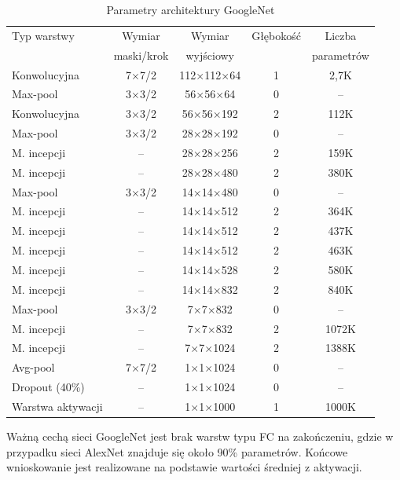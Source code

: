 \begin{table}[h!]
	\setlength{\tabcolsep}{14pt}
	\centering
	\caption{Parametry architektury GoogleNet}
	\scriptsize
	\label{tab:USG-params}
	\begin{tabular}{l | c | c | c | c }
		Typ warstwy  & Wymiar  & Wymiar & Głębokość & Liczba   \\  
		& maski/krok & wyjściowy &&parametrów\\
	    \hline \hline
		Konwolucyjna   & 7$\times$7/2 & 112$\times$112$\times$64 & 1 & 2,7K \\ \hline
		Max-pool & 3$\times$3/2 & 56$\times$56$\times$64 & 0 & --  \\ \hline
		Konwolucyjna & 3$\times$3/2 & 56$\times$56$\times$192 & 2 & 112K  \\ \hline
		Max-pool & 3$\times$3/2 & 28$\times$28$\times$192 & 0 & --  \\ \hline
		M. incepcji & -- & 28$\times$28$\times$256 & 2 & 159K  \\ \hline
		M. incepcji & -- & 28$\times$28$\times$480 & 2 & 380K  \\ \hline
		Max-pool & 3$\times$3/2 & 14$\times$14$\times$480 & 0 & --  \\ \hline
		M. incepcji & -- & 14$\times$14$\times$512 & 2 & 364K  \\ \hline
		M. incepcji & -- & 14$\times$14$\times$512 & 2 & 437K  \\ \hline
		M. incepcji & -- & 14$\times$14$\times$512 & 2 & 463K  \\ \hline
		M. incepcji & -- & 14$\times$14$\times$528 & 2 & 580K  \\ \hline
		M. incepcji & -- & 14$\times$14$\times$832 & 2 & 840K  \\ \hline
		Max-pool & 3$\times$3/2 & 7$\times$7$\times$832 & 0 & --  \\ \hline
		M. incepcji & -- & 7$\times$7$\times$832 & 2 & 1072K  \\ \hline
		M. incepcji & -- & 7$\times$7$\times$1024 & 2 & 1388K  \\ \hline
		Avg-pool & 7$\times$7/2 & 1$\times$1$\times$1024 & 0 & --  \\ \hline
		Dropout (40\%) & -- & 1$\times$1$\times$1024 & 0 & --  \\ \hline
		Warstwa aktywacji & -- & 1$\times$1$\times$1000 & 1 & 1000K  \\ \hline
	\end{tabular}
	\label{GoogleNetParams}
\end{table}
\renewcommand{\arraystretch}{1}
Ważną cechą sieci GoogleNet jest brak warstw typu FC na zakończeniu, gdzie w przypadku sieci AlexNet znajduje się około 90\% parametrów. Końcowe wnioskowanie jest realizowane na podstawie wartości średniej z aktywacji.

